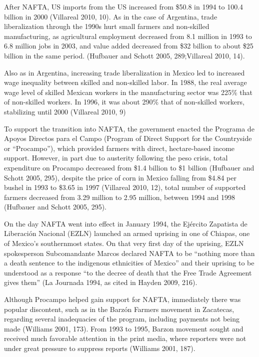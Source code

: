 \documentclass[a4paper]{article}\usepackage[]{graphicx}\usepackage[]{color}
\begin{document}
After NAFTA, US imports from the US increased from \$50.8 in 1994 to 100.4 billion in 2000 (Villareal 2010, 10). As in the case of Argentina, trade liberalization through the 1990s hurt small farmers and non-skilled manufacturing, as agricultural employment decreased from 8.1 million in 1993 to 6.8 million jobs in 2003, and value added decreased from \$32 billion to about \$25 billion in the same period. (Hufbauer and Schott 2005, 289;Villareal 2010, 14).

Also as in Argentina, increasing trade liberalization in Mexico led to increased wage inequality between skilled and non-skilled labor. In 1988, the real average wage level of skilled Mexican workers in the manufacturing sector was 225\% that of non-skilled workers. In 1996, it was about 290\% that of non-skilled workers, stabilizing until 2000 (Villareal 2010, 9) 

To support the transition into NAFTA, the government enacted the Programa de Apoyos Directos para el Campo (Program of Direct Support for the Countryside or “Procampo”), which provided farmers with direct, hectare-based income support. However, in part due to austerity following the peso crisis, total expenditure on Procampo decreased from \$1.4 billion to \$1 billion (Hufbauer and Schott 2005, 295), despite the price of corn in Mexico falling from \$4.84 per bushel in 1993 to \$3.65 in 1997 (Villareal 2010, 12), total number of supported farmers decreased from 3.29 million to 2.95 million, between 1994 and 1998 (Hufbauer and Schott 2005, 295).

On the day NAFTA went into effect in January 1994, the Ejército Zapatista de Liberación Nacional (EZLN) launched an armed uprising in one of Chiapas, one of Mexico's southernmost states. On that very first day of the uprising, EZLN spokesperson Subcomandante Marcos declared NAFTA to be “nothing more than a death sentence to the indigenous ethnicities of Mexico” and their uprising to be understood as a response “to the decree of death that the Free Trade Agreement gives them” (La Journada 1994, as cited in Hayden 2009, 216).

Although Procampo helped gain support for NAFTA, immediately there was popular discontent, such as in the Barzón Farmers movement in Zacatecas, regarding several inadequacies of the program, including payments not being made (Williams 2001, 173). From 1993 to 1995, Barzon movement sought and received much favorable attention in the print media, where reporters were not under great pressure to suppress reports (Williams 2001, 187).
\end{document}
